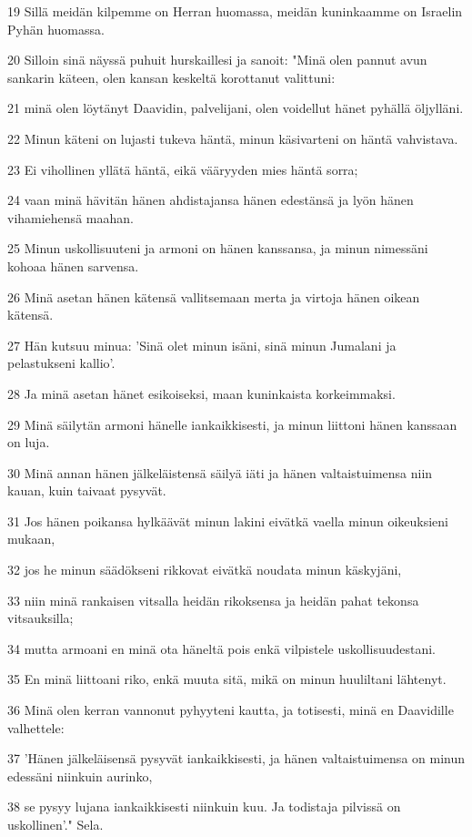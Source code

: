 \par 19 Sillä meidän kilpemme on Herran huomassa, meidän kuninkaamme on Israelin Pyhän huomassa.
\par 20 Silloin sinä näyssä puhuit hurskaillesi ja sanoit: "Minä olen pannut avun sankarin käteen, olen kansan keskeltä korottanut valittuni:
\par 21 minä olen löytänyt Daavidin, palvelijani, olen voidellut hänet pyhällä öljylläni.
\par 22 Minun käteni on lujasti tukeva häntä, minun käsivarteni on häntä vahvistava.
\par 23 Ei vihollinen yllätä häntä, eikä vääryyden mies häntä sorra;
\par 24 vaan minä hävitän hänen ahdistajansa hänen edestänsä ja lyön hänen vihamiehensä maahan.
\par 25 Minun uskollisuuteni ja armoni on hänen kanssansa, ja minun nimessäni kohoaa hänen sarvensa.
\par 26 Minä asetan hänen kätensä vallitsemaan merta ja virtoja hänen oikean kätensä.
\par 27 Hän kutsuu minua: 'Sinä olet minun isäni, sinä minun Jumalani ja pelastukseni kallio'.
\par 28 Ja minä asetan hänet esikoiseksi, maan kuninkaista korkeimmaksi.
\par 29 Minä säilytän armoni hänelle iankaikkisesti, ja minun liittoni hänen kanssaan on luja.
\par 30 Minä annan hänen jälkeläistensä säilyä iäti ja hänen valtaistuimensa niin kauan, kuin taivaat pysyvät.
\par 31 Jos hänen poikansa hylkäävät minun lakini eivätkä vaella minun oikeuksieni mukaan,
\par 32 jos he minun säädökseni rikkovat eivätkä noudata minun käskyjäni,
\par 33 niin minä rankaisen vitsalla heidän rikoksensa ja heidän pahat tekonsa vitsauksilla;
\par 34 mutta armoani en minä ota häneltä pois enkä vilpistele uskollisuudestani.
\par 35 En minä liittoani riko, enkä muuta sitä, mikä on minun huuliltani lähtenyt.
\par 36 Minä olen kerran vannonut pyhyyteni kautta, ja totisesti, minä en Daavidille valhettele:
\par 37 'Hänen jälkeläisensä pysyvät iankaikkisesti, ja hänen valtaistuimensa on minun edessäni niinkuin aurinko,
\par 38 se pysyy lujana iankaikkisesti niinkuin kuu. Ja todistaja pilvissä on uskollinen'." Sela.
